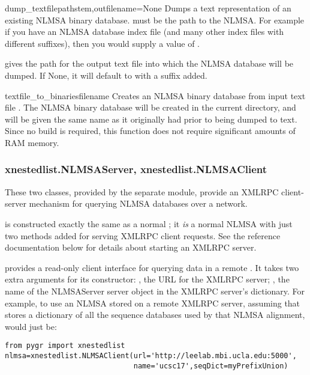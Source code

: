 \documentclass{howto}
\begin{document}
\begin{funcdesc}{dump_textfile}{pathstem,outfilename=None}
  Dumps a text representation of an existing NLMSA binary database.
   must be the path to the NLMSA.  For
  example if you have an NLMSA database index file 
  (and many other index files with different suffixes),
  then you would supply a  value of .

   gives the path for the output text file into which the
  NLMSA database will be dumped.  If None, it will default to  with a
   suffix added.
\end{funcdesc}


\begin{funcdesc}{textfile_to_binaries}{filename}
  Creates an NLMSA binary database from input text file .
  The NLMSA binary database will be created in the current directory,
  and will be given the same name as it originally had prior to being dumped to text.
  Since no build is required, this function does not require significant amounts
  of RAM memory.
\end{funcdesc}



\subsubsection{xnestedlist.NLMSAServer, xnestedlist.NLMSAClient}
These two classes, provided by the separate  module,
provide an XMLRPC client-server mechanism for querying NLMSA databases
over a network.  

 is constructed exactly the same as a normal ;
it {\em is} a normal NLMSA with just two methods added for serving XMLRPC client
requests.  See the  reference 
documentation below for details about starting an XMLRPC server.

 provides a read-only client interface for querying
data in a remote .  It takes two extra arguments for
its constructor: , the URL for the XMLRPC server; ,
the name of the NLMSAServer server object in the XMLRPC server's dictionary.
For example, to use an NLMSA stored on a remote XMLRPC server,
assuming that  stores a dictionary of all the
sequence databases used by that NLMSA alignment, would just be:
\begin{verbatim}
from pygr import xnestedlist
nlmsa=xnestedlist.NLMSAClient(url='http://leelab.mbi.ucla.edu:5000',
                              name='ucsc17',seqDict=myPrefixUnion)
\end{verbatim}
\end{document}
